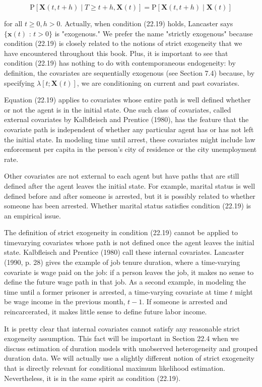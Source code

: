 \documentclass[10pt]{article}
\begin{document}
\begin{equation*}
\mathrm{P}[\mathbf{X}(t, t+h) \mid T \geq t+h, \mathbf{X}(t)]=\mathrm{P}[\mathbf{X}(t, t+h) \mid \mathbf{X}(t)] \tag{22.19}
\end{equation*}


for all $t \geq 0, h>0$. Actually, when condition (22.19) holds, Lancaster says $\{\mathbf{x}(t)$ : $t>0\}$ is "exogenous." We prefer the name "strictly exogenous" because condition (22.19) is closely related to the notions of strict exogeneity that we have encountered throughout this book. Plus, it is important to see that condition (22.19) has nothing to do with contemporaneous endogeneity: by definition, the covariates are sequentially exogenous (see Section 7.4) because, by specifying $\lambda[t ; \mathbf{X}(t)]$, we are conditioning on current and past covariates.

Equation (22.19) applies to covariates whose entire path is well defined whether or not the agent is in the initial state. One such class of covariates, called external covariates by Kalbfleisch and Prentice (1980), has the feature that the covariate path is independent of whether any particular agent has or has not left the initial state. In modeling time until arrest, these covariates might include law enforcement per capita in the person's city of residence or the city unemployment rate.

Other covariates are not external to each agent but have paths that are still defined after the agent leaves the initial state. For example, marital status is well defined before and after someone is arrested, but it is possibly related to whether someone has been arrested. Whether marital status satisfies condition (22.19) is an empirical issue.

The definition of strict exogeneity in condition (22.19) cannot be applied to timevarying covariates whose path is not defined once the agent leaves the initial state. Kalbfleisch and Prentice (1980) call these internal covariates. Lancaster (1990, p. 28) gives the example of job tenure duration, where a time-varying covariate is wage paid on the job: if a person leaves the job, it makes no sense to define the future wage path in that job. As a second example, in modeling the time until a former prisoner is arrested, a time-varying covariate at time $t$ might be wage income in the previous month, $t-1$. If someone is arrested and reincarcerated, it makes little sense to define future labor income.

It is pretty clear that internal covariates cannot satisfy any reasonable strict exogeneity assumption. This fact will be important in Section 22.4 when we discuss estimation of duration models with unobserved heterogeneity and grouped duration data. We will actually use a slightly different notion of strict exogeneity that is directly relevant for conditional maximum likelihood estimation. Nevertheless, it is in the same spirit as condition (22.19).
\end{document}
